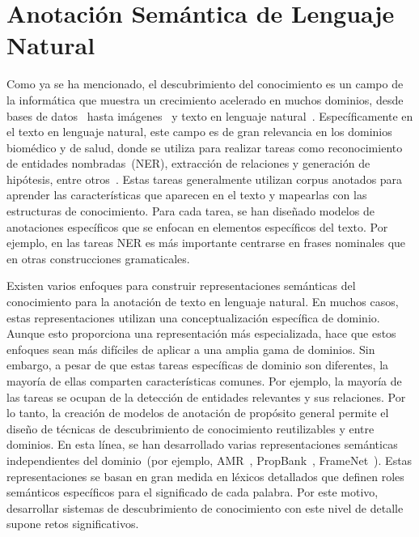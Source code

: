\section{Anotación Semántica de Lenguaje Natural}\label{sec:sota-annotation}

Como ya se ha mencionado, el descubrimiento del conocimiento es un campo de la informática que muestra un crecimiento acelerado en muchos dominios, desde bases de datos~\cite{fayyad1996data, knowledgeDatabase} hasta imágenes~\cite{lu2016visual} y texto en lenguaje natural~\cite{carlson2010toward}.
Específicamente en el texto en lenguaje natural, este campo es de gran relevancia en los dominios biomédico y de salud, donde se utiliza para realizar tareas como
reconocimiento de entidades nombradas~(NER), extracción de relaciones y generación de hipótesis, entre otros~\cite{simpson2012biomedical}.
Estas tareas generalmente utilizan corpus anotados para aprender las características que aparecen en el texto y mapearlas con las estructuras de conocimiento.
Para cada tarea, se han diseñado modelos de anotaciones específicos que se enfocan en elementos específicos del texto.
Por ejemplo, en las tareas NER es más importante centrarse en frases nominales que en otras construcciones gramaticales.

Existen varios enfoques para construir representaciones semánticas del conocimiento para la anotación de texto en lenguaje natural.
En muchos casos, estas representaciones utilizan una conceptualización específica de dominio.
Aunque esto proporciona una representación más especializada, hace que estos enfoques sean más difíciles de aplicar a una amplia gama de dominios.
Sin embargo, a pesar de que estas tareas específicas de dominio son diferentes, la mayoría de ellas comparten características comunes.
Por ejemplo, la mayoría de las tareas se ocupan de la detección de entidades relevantes y sus relaciones.
Por lo tanto, la creación de modelos de anotación de propósito general permite el diseño de técnicas de descubrimiento de conocimiento reutilizables y entre dominios.
En esta línea, se han desarrollado varias representaciones semánticas independientes del dominio~(por ejemplo, AMR~\cite{amr}, PropBank~\cite{propbank}, FrameNet~\cite{framenet}).
Estas representaciones se basan en gran medida en léxicos detallados que definen roles semánticos específicos para el significado de cada palabra.
Por este motivo, desarrollar sistemas de descubrimiento de conocimiento con este nivel de detalle supone retos significativos.

